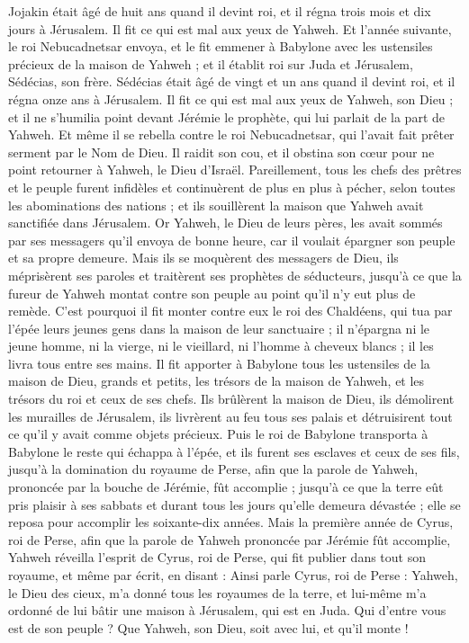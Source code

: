 \begin{multicols}{2}
Jojakin était âgé de huit ans quand il devint roi, et il régna trois mois et dix jours à Jérusalem. Il fit ce qui est mal aux yeux de Yahweh.
Et l'année suivante, le roi Nebucadnetsar envoya, et le fit emmener à Babylone avec les ustensiles précieux de la maison de Yahweh ; et il établit roi sur Juda et Jérusalem, Sédécias, son frère.
Sédécias était âgé de vingt et un ans quand il devint roi, et il régna onze ans à Jérusalem.
Il fit ce qui est mal aux yeux de Yahweh, son Dieu ; et il ne s'humilia point devant Jérémie le prophète, qui lui parlait de la part de Yahweh.
Et même il se rebella contre le roi Nebucadnetsar, qui l'avait fait prêter serment par le Nom de Dieu. Il raidit son cou, et il obstina son cœur pour ne point retourner à Yahweh, le Dieu d'Israël.
Pareillement, tous les chefs des prêtres et le peuple furent infidèles et continuèrent de plus en plus à pécher, selon toutes les abominations des nations ; et ils souillèrent la maison que Yahweh avait sanctifiée dans Jérusalem.
Or Yahweh, le Dieu de leurs pères, les avait sommés par ses messagers qu'il envoya de bonne heure, car il voulait épargner son peuple et sa propre demeure.
Mais ils se moquèrent des messagers de Dieu, ils méprisèrent ses paroles et traitèrent ses prophètes de séducteurs, jusqu'à ce que la fureur de Yahweh montat contre son peuple au point qu'il n'y eut plus de remède.
C'est pourquoi il fit monter contre eux le roi des Chaldéens, qui tua par l'épée leurs jeunes gens dans la maison de leur sanctuaire ; il n'épargna ni le jeune homme, ni la vierge, ni le vieillard, ni l'homme à cheveux blancs ; il les livra tous entre ses mains.
Il fit apporter à Babylone tous les ustensiles de la maison de Dieu, grands et petits, les trésors de la maison de Yahweh, et les trésors du roi et ceux de ses chefs.
Ils brûlèrent la maison de Dieu, ils démolirent les murailles de Jérusalem, ils livrèrent au feu tous ses palais et détruisirent tout ce qu'il y avait comme objets précieux.
Puis le roi de Babylone transporta à Babylone le reste qui échappa à l'épée, et ils furent ses esclaves et ceux de ses fils, jusqu'à la domination du royaume de Perse,
afin que la parole de Yahweh, prononcée par la bouche de Jérémie, fût accomplie ; jusqu'à ce que la terre eût pris plaisir à ses sabbats et durant tous les jours qu'elle demeura dévastée ; elle se reposa pour accomplir les soixante-dix années.
Mais la première année de Cyrus, roi de Perse, afin que la parole de Yahweh prononcée par Jérémie fût accomplie, Yahweh réveilla l'esprit de Cyrus, roi de Perse, qui fit publier dans tout son royaume, et même par écrit, en disant :
Ainsi parle Cyrus, roi de Perse : Yahweh, le Dieu des cieux, m'a donné tous les royaumes de la terre, et lui-même m'a ordonné de lui bâtir une maison à Jérusalem, qui est en Juda. Qui d'entre vous est de son peuple ? Que Yahweh, son Dieu, soit avec lui, et qu'il monte !
\PPE{}
\end{multicols}
